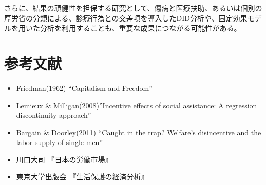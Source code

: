 \documentclass{jsarticle}[12pt]
\begin{document}
さらに、結果の頑健性を担保する研究として、傷病と医療扶助、あるいは個別の厚労省の分類による、診療行為との交差項を導入したDID分析や、固定効果モデルを用いた分析を利用することも、重要な成果につながる可能性がある。

\section{参考文献}

 \begin{itemize}
 
 \item Friedman(1962) ``Capitalism and Freedom''
 
 \item Lemieux \& Milligan(2008)''Incentive effects of social assistance: A regression
discontinuity approach''
 
 \item Bargain \& Doorley(2011) ``Caught in the trap? Welfare's disincentive and the labor supply of single men''
 
 \item 川口大司 『日本の労働市場』
 
 \item 東京大学出版会 『生活保護の経済分析』
 
 \end{itemize}
\end{document}
